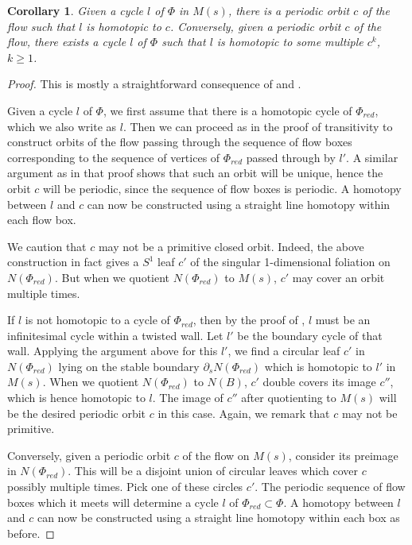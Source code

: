 \documentclass[12pt]{amsart}
\newtheorem{cor}[thm]{Corollary}
\theoremstyle{definition}
\numberwithin{equation}{section}
\begin{document}
\begin{cor} \label{cor:symbdyn}
Given a cycle $l$ of $\Phi$ in $M(s)$, there is a periodic orbit $c$ of the flow such that $l$ is homotopic to $c$. Conversely, given a periodic orbit $c$ of the flow, there exists a cycle $l$ of $\Phi$ such that $l$ is homotopic to some multiple $c^k$, $k \geq 1$.
\end{cor}

\begin{proof}
This is mostly a straightforward consequence of  and .

Given a cycle $l$ of $\Phi$, we first assume that there is a homotopic cycle of $\Phi_{red}$, which we also write as $l$. Then we can proceed as in the proof of transitivity to construct orbits of the flow passing through the sequence of flow boxes corresponding to the sequence of vertices of $\Phi_{red}$ passed through by $l'$. A similar argument as in that proof shows that such an orbit will be unique, hence the orbit $c$ will be periodic, since the sequence of flow boxes is periodic. A homotopy between $l$ and $c$ can now be constructed using a straight line homotopy within each flow box.

We caution that $c$ may not be a primitive closed orbit. Indeed, the above construction in fact gives a $S^1$ leaf $c'$ of the singular 1-dimensional foliation on $N(\Phi_{red})$. But when we quotient $N(\Phi_{red})$ to $M(s)$, $c'$ may cover an orbit multiple times.

If $l$ is not homotopic to a cycle of $\Phi_{red}$, then by the proof of , $l$ must be an infinitesimal cycle within a twisted wall. Let $l'$ be the boundary cycle of that wall. Applying the argument above for this $l'$, we find a circular leaf $c'$ in $N(\Phi_{red})$ lying on the stable boundary $\partial_s N(\Phi_{red})$ which is homotopic to $l'$ in $M(s)$. When we quotient $N(\Phi_{red})$ to $N(B)$, $c'$ double covers its image $c''$, which is hence homotopic to $l$. The image of $c''$ after quotienting to $M(s)$ will be the desired periodic orbit $c$ in this case. Again, we remark that $c$ may not be primitive.

Conversely, given a periodic orbit $c$ of the flow on $M(s)$, consider its preimage in $N(\Phi_{red})$. This will be a disjoint union of circular leaves which cover $c$ possibly multiple times. Pick one of these circles $c'$. The periodic sequence of flow boxes which it meets will determine a cycle $l$ of $\Phi_{red} \subset \Phi$. A homotopy between $l$ and $c$ can now be constructed using a straight line homotopy within each box as before.
\end{proof}
\end{document}
